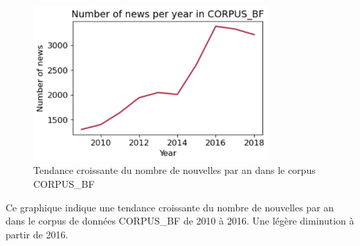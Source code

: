 \documentclass{article}
\begin{document}
\begin{figure}[h]
    \centering
    \includegraphics[width=0.8\textwidth]{nbr_articles_an.png}
    \caption{Tendance croissante du nombre de nouvelles par an dans le corpus CORPUS_BF}
    \label{fig:nbr_articles_an}
\end{figure}
\vspace{6cm}

Ce graphique indique une tendance croissante du nombre de nouvelles par an dans le corpus de données CORPUS_BF de 2010 à 2016. Une légère diminution à partir de 2016.
\end{document}

